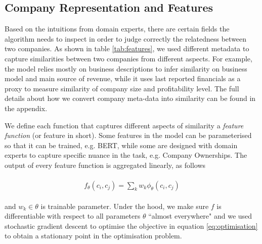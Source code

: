 \documentclass[]{article}
\begin{document}
\subsection{Company Representation and Features}
Based on the intuitions from domain experts, there are 
certain fields the algorithm needs to inspect in order to judge correctly the
relatedness between two companies. As shown in 
table \ref{tab:features}, we used different metadata to capture similarities 
between two companies from different aspects. For example, the 
model relies mostly on business descriptions to infer similarity on business 
model and main source of revenue, while it uses last reported financials as a 
proxy to measure similarity of company size and profitability level. The full 
details about how we convert company meta-data into similarity can be found in 
the appendix.

We define each function that captures different aspects of similarity a 
\textit{feature 
function} (or feature in short). Some 
features in the model can be parameterised so that it can be trained, 
e.g. BERT\cite{devlin2018bert}, while some are designed with domain experts to 
capture specific nuance in the task, e.g. Company Ownerships. The output of 
every 
feature function is aggregated linearly, as follows

\begin{align}
\begin{split}
f_{\theta}(c_i, c_j) = \sum_k w_k \phi_\theta(c_i, c_j)
\end{split}
\end{align}

and $w_k\in\theta$ is trainable parameter. Under the hood, we make sure $f$ is 
differentiable with respect to all parameters $\theta$ ``almost everywhere" and 
we used stochastic gradient descent \cite{bottou2018optimization} to optimise 
the objective in equation \ref{eq:optimisation} to obtain a stationary point in 
the optimisation problem.
\end{document}
